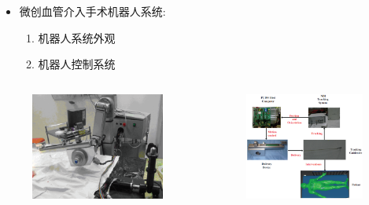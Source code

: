\begin{frame}
\begin{itemize}
  \item 微创血管介入手术机器人系统: 
  \begin{enumerate}
    \item 机器人系统外观
    \item 机器人控制系统
  \end{enumerate}
\end{itemize}
\begin{columns}[b,onlytextwidth]
\begin{column}{.5\textwidth}
\begin{figure}[t]
\centering
\includegraphics[height=100pt]{../../Figures/background/robot.eps}
\end{figure}
\end{column}
\begin{column}{.5\textwidth}
\begin{figure}[t]
\centering
\includegraphics[height=100pt]{../../Figures/background/robot_arch.eps}
\end{figure}
\end{column}
\end{columns}
\end{frame}

